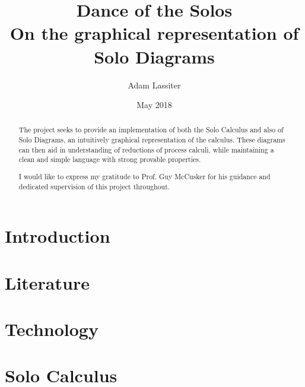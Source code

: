 \documentclass{article}
\title{Dance of the Solos \\
    \large On the graphical representation of Solo Diagrams}
\author{Adam Lassiter}
\date{May 2018}
\begin{document}
    
    \maketitle
    \vspace{\fill}
    \begin{abstract}
        The project seeks to provide an implementation of both the Solo Calculus and also of Solo Diagrams, an intuitively graphical representation of the calculus.
        These diagrams can then aid in understanding of reductions of process calculi, while maintaining a clean and simple language with strong provable properties.
    \end{abstract}
    \vspace{\fill}
    \begin{figure}[H]
        \centering
        \def\svgwidth{\columnwidth/3}
        
    \end{figure}
    \vspace{\fill}
    \pagebreak
    
    \renewcommand{\abstractname}{Acknowledgements}
    \null\vspace{\fill}
    \begin{abstract}
        I would like to express my gratitude to Prof. Guy McCusker for his guidance and dedicated supervision of this project throughout.
    \end{abstract}
    \vspace{\fill}
    \pagebreak
    
    \tableofcontents
    \pagebreak

    \section{Introduction}
        

    \section{Literature}
        
        
        
        
        

    \section{Technology}
        

    \section{Solo Calculus}
        
        
        
\end{document}
